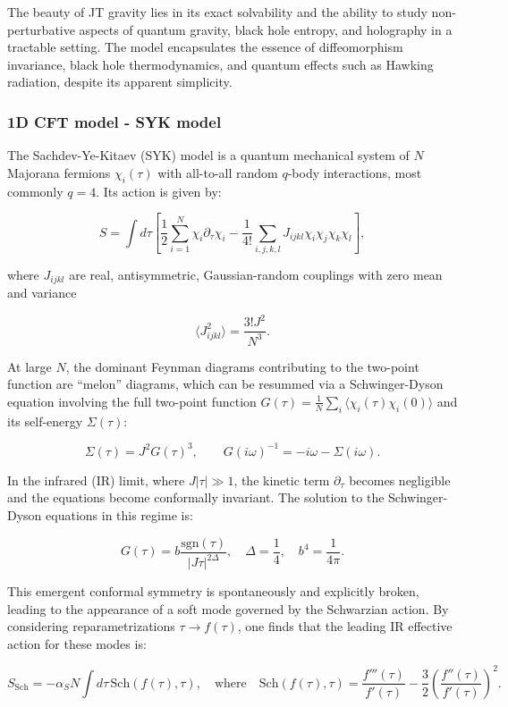 The beauty of JT gravity lies in its exact solvability and the ability to study non-perturbative aspects of quantum gravity, black hole entropy, and holography in a tractable setting. The model encapsulates the essence of diffeomorphism invariance, black hole thermodynamics, and quantum effects such as Hawking radiation, despite its apparent simplicity.


\subsubsection{1D CFT model - SYK model}
The Sachdev-Ye-Kitaev (SYK) model is a quantum mechanical system of $N$ Majorana fermions $\chi_i(\tau)$ with all-to-all random $q$-body interactions, most commonly $q = 4$. Its action is given by:

$$
S = \int d\tau \left[ \frac{1}{2} \sum_{i=1}^{N} \chi_i \partial_\tau \chi_i - \frac{1}{4!} \sum_{i,j,k,l} J_{ijkl} \chi_i \chi_j \chi_k \chi_l \right],
$$

where $J_{ijkl}$ are real, antisymmetric, Gaussian-random couplings with zero mean and variance

$$
\langle J_{ijkl}^2 \rangle = \frac{3! J^2}{N^3}.
$$

At large $N$, the dominant Feynman diagrams contributing to the two-point function are “melon” diagrams, which can be resummed via a Schwinger-Dyson equation involving the full two-point function $G(\tau) = \frac{1}{N} \sum_i \langle \chi_i(\tau) \chi_i(0) \rangle$ and its self-energy $\Sigma(\tau)$:

$$
\Sigma(\tau) = J^2 G(\tau)^3, \qquad G(i\omega)^{-1} = -i\omega - \Sigma(i\omega).
$$

In the infrared (IR) limit, where $J|\tau| \gg 1$, the kinetic term $\partial_\tau$ becomes negligible and the equations become conformally invariant. The solution to the Schwinger-Dyson equations in this regime is:

$$
G(\tau) = b \frac{\text{sgn}(\tau)}{|J \tau|^{2\Delta}}, \quad \Delta = \frac{1}{4}, \quad b^4 = \frac{1}{4\pi}.
$$

This emergent conformal symmetry is spontaneously and explicitly broken, leading to the appearance of a soft mode governed by the Schwarzian action. By considering reparametrizations $\tau \to f(\tau)$, one finds that the leading IR effective action for these modes is:

$$
S_{\text{Sch}} = -\alpha_S N \int d\tau \, \text{Sch}(f(\tau), \tau), \quad \text{where} \quad \text{Sch}(f(\tau), \tau) = \frac{f'''(\tau)}{f'(\tau)} - \frac{3}{2} \left( \frac{f''(\tau)}{f'(\tau)} \right)^2.
$$

